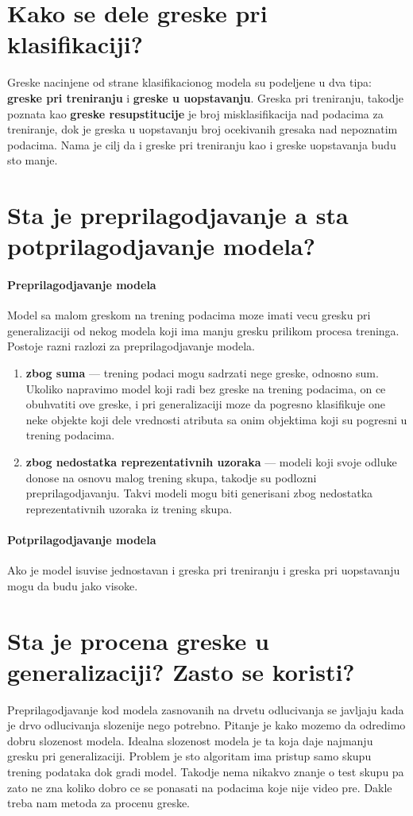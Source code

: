 \documentclass[a4paper]{article}
\begin{document}
\section{Kako se dele greske pri klasifikaciji?}
Greske nacinjene od strane klasifikacionog modela su podeljene u dva tipa: \textbf{greske pri
treniranju} i \textbf{greske u uopstavanju}. Greska pri treniranju, takodje poznata kao
\textbf{greske resupstitucije} je broj misklasifikacija nad podacima za treniranje, dok je greska u
uopstavanju broj ocekivanih gresaka nad nepoznatim podacima. Nama je cilj da i greske pri treniranju
kao i greske uopstavanja budu sto manje.

\section{Sta je preprilagodjavanje a sta potprilagodjavanje modela?}
\paragraph{Preprilagodjavanje modela} Model sa malom greskom na trening podacima moze imati vecu
gresku pri generalizaciji od nekog modela koji ima manju gresku prilikom procesa treninga. Postoje
razni razlozi za preprilagodjavanje modela.
\begin{enumerate}
    \item \textbf{zbog suma} --- trening podaci mogu sadrzati nege greske,
        odnosno sum.  Ukoliko napravimo model koji radi bez greske na trening podacima, on ce
        obuhvatiti ove greske, i pri generalizaciji moze da pogresno klasifikuje one neke objekte
        koji dele vrednosti atributa sa onim objektima koji su pogresni u trening podacima.
    \item \textbf{zbog nedostatka reprezentativnih uzoraka} --- modeli koji svoje odluke donose na
        osnovu malog trening skupa, takodje su podlozni preprilagodjavanju. Takvi modeli mogu biti
        generisani zbog nedostatka reprezentativnih uzoraka iz trening skupa.
\end{enumerate}

\paragraph{Potprilagodjavanje modela} Ako je model isuvise jednostavan i greska pri treniranju i
greska pri uopstavanju mogu da budu jako visoke.

\section{Sta je procena greske u generalizaciji? Zasto se koristi?}
Preprilagodjavanje kod modela zasnovanih na drvetu odlucivanja se javljaju kada je drvo odlucivanja
slozenije nego potrebno. Pitanje je kako mozemo da odredimo dobru slozenost modela. Idealna
slozenost modela je ta koja daje najmanju gresku pri generalizaciji. Problem je sto algoritam ima
pristup samo skupu trening podataka dok gradi model. Takodje nema nikakvo znanje o test skupu pa
zato ne zna koliko dobro ce se ponasati na podacima koje nije video pre. Dakle treba nam metoda za
procenu greske.
\end{document}
